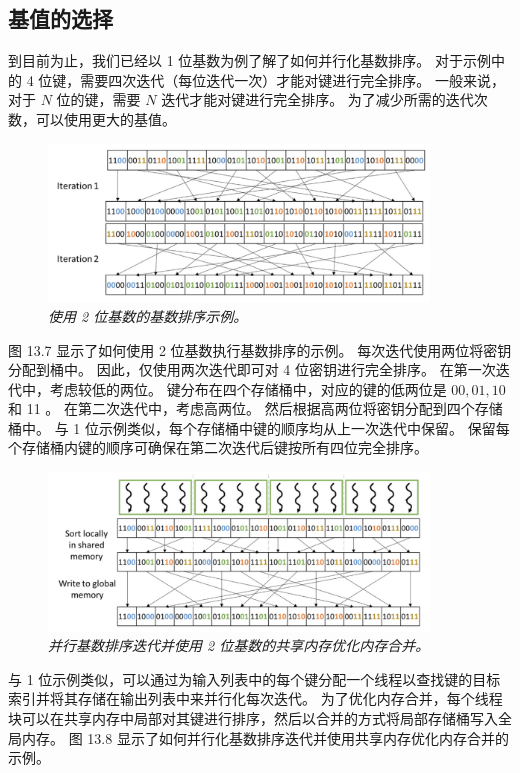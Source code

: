 \subsection{基值的选择}
到目前为止，我们已经以 1 位基数为例了解了如何并行化基数排序。 
对于示例中的 4 位键，需要四次迭代（每位迭代一次）才能对键进行完全排序。 
一般来说，对于 $N$ 位的键，需要 $N$ 迭代才能对键进行完全排序。 为了减少所需的迭代次数，可以使用更大的基值。

\begin{figure}[H]
	\centering
	\includegraphics[width=0.9\textwidth]{figs/F13.7.png}
	\caption{\textit{使用 2 位基数的基数排序示例。}}
\end{figure}

图 13.7 显示了如何使用 2 位基数执行基数排序的示例。 每次迭代使用两位将密钥分配到桶中。 
因此，仅使用两次迭代即可对 4 位密钥进行完全排序。 在第一次迭代中，考虑较低的两位。 
键分布在四个存储桶中，对应的键的低两位是 $00,01,10$ 和 11 。 在第二次迭代中，考虑高两位。 
然后根据高两位将密钥分配到四个存储桶中。 与 1 位示例类似，每个存储桶中键的顺序均从上一次迭代中保留。 
保留每个存储桶内键的顺序可确保在第二次迭代后键按所有四位完全排序。

\begin{figure}[H]
	\centering
	\includegraphics[width=0.9\textwidth]{figs/F13.8.png}
	\caption{\textit{并行基数排序迭代并使用 2 位基数的共享内存优化内存合并。}}
\end{figure}

与 1 位示例类似，可以通过为输入列表中的每个键分配一个线程以查找键的目标索引并将其存储在输出列表中来并行化每次迭代。 
为了优化内存合并，每个线程块可以在共享内存中局部对其键进行排序，然后以合并的方式将局部存储桶写入全局内存。 
图 13.8 显示了如何并行化基数排序迭代并使用共享内存优化内存合并的示例。

